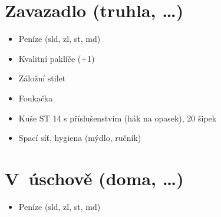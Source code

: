 \documentclass[11pt]{article}
\begin{document}
\vspace{4\baselineskip}

\section*{Zavazadlo (truhla, \ldots)}
\begin{itemize}
  \item Peníze (\hspace{1em}sld, \hspace{1em}zl, \hspace{1em}st, \hspace{1em}md)
  \item Kvalitní paklíče (+1)
  \item Záložní stilet
  \item Foukačka
  \item Kuše ST 14 s příslušenstvím (hák na opasek), 20 šipek
  \item Spací síť, hygiena (mýdlo, ručník)
\end{itemize}

\vspace{5\baselineskip}

\section*{V~úschově (doma, \ldots)}
\begin{itemize}
  \item Peníze (\hspace{1em}sld, \hspace{1em}zl, \hspace{1em}st, \hspace{1em}md)
\end{itemize}
\end{document}
